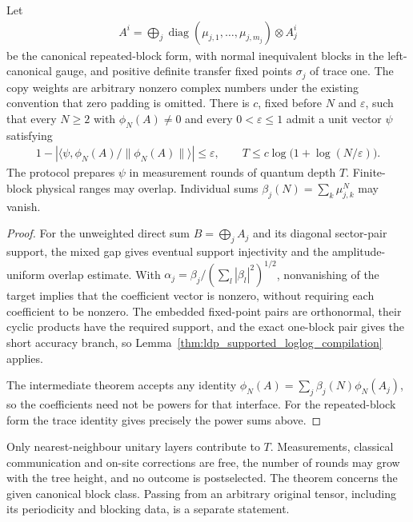 \begin{lemma}
    \label{thm:ldp_nonnormal_loglog}
    \leanok
    Let
    \begin{align*}
        A^i=\bigoplus_j\operatorname{diag}(\mu_{j,1},\ldots,\mu_{j,m_j})
        \otimes A_j^i
    \end{align*}
    be the canonical repeated-block form, with normal inequivalent blocks
    in the left-canonical gauge, and positive definite transfer fixed points
    $\sigma_j$ of trace one. The copy weights are arbitrary nonzero complex
    numbers under the existing convention that zero padding is omitted.
    There is $c$, fixed before $N$ and $\varepsilon$, such that every
    $N\ge2$ with $\phi_N(A)\ne0$ and every $0<\varepsilon\le1$ admit
    a unit vector $\psi$ satisfying
    \begin{align*}
        1-|\langle\psi,\phi_N(A)/\|\phi_N(A)\|\rangle|\le\varepsilon,
        \qquad T\le c\log\bigl(1+\log(N/\varepsilon)\bigr).
    \end{align*}
    The protocol prepares $\psi$ in measurement rounds of quantum depth $T$.
    Finite-block physical ranges may overlap. Individual sums
    $\beta_j(N)=\sum_k\mu_{j,k}^N$ may vanish.
\end{lemma}
\begin{proof}
    \leanok
    For the unweighted direct sum $B=\bigoplus_jA_j$ and its
    diagonal sector-pair support, the mixed gap gives eventual support
    injectivity and the amplitude-uniform overlap estimate. With
    $\alpha_j=\beta_j/(\sum_l|\beta_l|^2)^{1/2}$, nonvanishing of the
    target implies that the coefficient vector is nonzero, without
    requiring each coefficient to be nonzero. The embedded fixed-point
    pairs are orthonormal, their cyclic products have the required
    support, and the exact one-block pair gives the short accuracy branch,
    so Lemma~\ref{thm:ldp_supported_loglog_compilation} applies.

    The intermediate theorem accepts any identity
    $\phi_N(A)=\sum_j\beta_j(N)\phi_N(A_j)$, so the coefficients need not
    be powers for that interface. For the repeated-block form the trace
    identity gives precisely the power sums above.
\end{proof}

Only nearest-neighbour unitary layers contribute to $T$. Measurements,
classical communication and on-site corrections are free, the number of
rounds may grow with the tree height, and no outcome is postselected.
The theorem concerns the given canonical block class. Passing from
an arbitrary original tensor, including its periodicity and blocking data,
is a separate statement.
